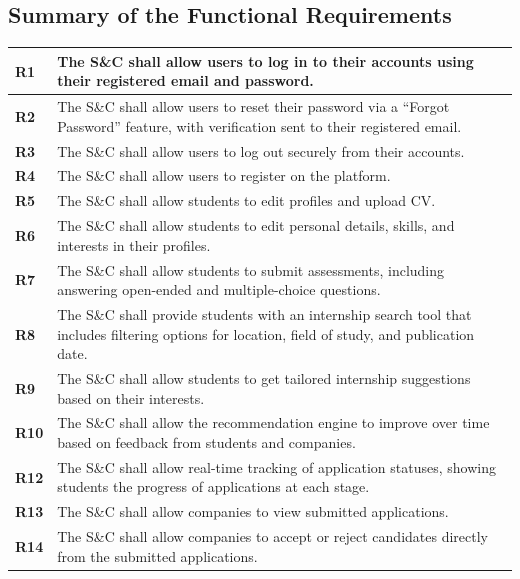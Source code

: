 \subsection{Summary of the Functional Requirements}
\begin{longtable}{|p{}|p{}|}
    \hline

    \textbf{R1} & The S\&C shall allow users to log in to their accounts using their registered email and password. \\
    \hline
    \textbf{R2} & The S\&C shall allow users to reset their password via a “Forgot Password” feature, with verification sent to their registered email. \\
    \hline
    \textbf{R3} & The S\&C shall allow users to log out securely from their accounts. \\
    \hline
    \textbf{R4} & The S\&C shall allow users to register on the platform. \\
    \hline

    \textbf{R5} & The S\&C shall allow students to edit profiles and upload CV. \\
    \hline
    \textbf{R6} & The S\&C shall allow students to edit personal details, skills, and interests in their profiles. \\
    \hline
    \textbf{R7} & The S\&C shall allow students to submit assessments, including answering open-ended and multiple-choice questions. \\
    \hline

    \textbf{R8} & The S\&C shall provide students with an internship search tool that includes filtering options for location, field of study, and publication date. \\
    \hline
    \textbf{R9} & The S\&C shall allow students to get tailored internship suggestions based on their interests. \\
    \hline
    \textbf{R10} & The S\&C shall allow the recommendation engine to improve over time based on feedback from students and companies. \\
    \hline

    \textbf{R12} & The S\&C shall allow real-time tracking of application statuses, showing students the progress of applications at each stage. \\
    \hline
    \textbf{R13} & The S\&C shall allow companies to view submitted applications. \\
    \hline
    \textbf{R14} & The S\&C shall allow companies to accept or reject candidates directly from the submitted applications. \\
    \hline


\end{longtable}
